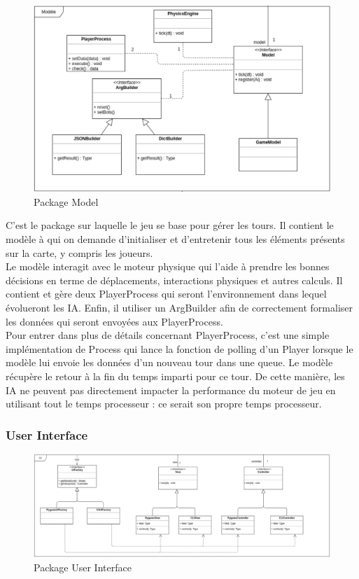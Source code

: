 \begin{figure}[H]
    \centering
    \includegraphics[scale=0.35]{data/archi/model.png}
    \caption{Package Model}
\end{figure}

C'est le package sur laquelle le jeu se base pour gérer les tours. Il contient le modèle à qui on demande d'initialiser et d'entretenir tous les éléments présents sur la carte, y compris les joueurs.\\

Le modèle interagit avec le moteur physique qui l'aide à prendre les bonnes décisions en terme de déplacements, interactions physiques et autres calculs. Il contient et gère deux PlayerProcess qui seront l'environnement dans lequel évolueront les IA. Enfin, il utiliser un ArgBuilder afin de correctement formaliser les données qui seront envoyées aux PlayerProcess.\\

Pour entrer dans plus de détails concernant PlayerProcess, c'est une simple implémentation de Process qui lance la fonction de polling d'un Player lorsque le modèle lui envoie les données d'un nouveau tour dans une queue. Le modèle récupère le retour à la fin du temps imparti pour ce tour. De cette manière, les IA ne peuvent pas directement impacter la performance du moteur de jeu en utilisant tout le temps processeur : ce serait son propre temps processeur.

\subsubsection{User Interface}

\begin{figure}[H]
    \centering
    \includegraphics[scale=0.35]{data/archi/ui.png}
    \caption{Package User Interface}
\end{figure}

